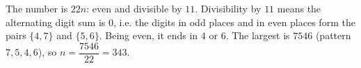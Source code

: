 The number is $22n$: even and divisible by $11$. Divisibility by $11$ means the alternating digit sum is $0$, i.e. the digits in odd places and in even places form the pairs $\{4,7\}$ and $\{5,6\}$. Being even, it ends in $4$ or $6$. The largest is $7546$ (pattern $7,5,4,6$), so $n=\dfrac{7546}{22}=\boxed{343}$.
